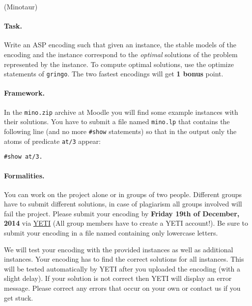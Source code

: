 \documentclass[a4paper,12pt]{article}
\begin{document}
\begin{PraktikumsAufgabe}{3}{(Minotaur)}
\paragraph{Task.}
%
Write an ASP encoding such that given an instance, 
the stable models of the encoding and the instance
correspond to the \emph{optimal} solutions of the problem represented by the instance.
To compute optimal solutions, use the optimize statements of \texttt{gringo}.
The two fastest encodings will get \textbf{1 bonus} point.

\paragraph{Framework.}

\noindent
In the
{\texttt{mino.zip}}
archive at Moodle you will find some example instances with their solutions.
You have to submit a file named \texttt{mino.lp} that contains the following line 
(and no more \texttt{\#show} statements)
so that in the output only the atoms of predicate \texttt{at/3} appear:
\vspace{-1.5mm}
\begin{verbatim}
#show at/3.
\end{verbatim}
\vspace{-1mm}

\noindent

\paragraph{Formalities.}
%
You can work on the project alone or in groups of two people.
Different groups have to submit different solutions, 
in case of plagiarism all groups involved will fail the project.
Please submit your encoding by \textbf{Friday 19th of December, 2014} via
\href{https://yeti.haiti.cs.uni-potsdam.de}{YETI}
(All group members have to create a YETI account!).
Be sure to submit your encoding in a file named 
containing only lowercase letters.

\noindent
We will test your encoding with the provided instances as well as additional instances.
Your encoding has to find the correct solutions for all instances.
This will be tested automatically by YETI after you uploaded the encoding (with a slight delay).
If your solution is not correct then YETI will display an error message.
Please correct any errors that occur on your own or contact us if you get stuck.


\end{PraktikumsAufgabe}
\end{document}
